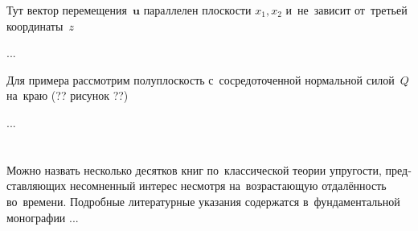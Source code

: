 \label{para:planedeformation.linearclassicalelasticity}

\begin{otherlanguage}{russian}

Тут вектор перемещения~$\bm{u}$ параллелен плоскости ${x_1, x_2}$ и~не~зависит от~третьей координаты~$z$

...

Для примера рассмотрим полуплоскость с~сосредоточенной нормальной силой~$Q$ на~краю (?? рисунок ??)

...

\end{otherlanguage}

\vspace{8mm}
\hfill\begin{minipage}[b]{0.95\linewidth}
\fontsize{10}{12}\selectfont

\section*{\wordforbibliography}

\begin{otherlanguage}{russian}

Можно назвать несколько десятков книг по~классической теории упругости, представляющих несомненный интерес несмотря на~возрастающую отдалённость во~времени. Подробные литературные указания содержатся в~фундаментальной монографии ...

\end{otherlanguage}

\end{minipage}
